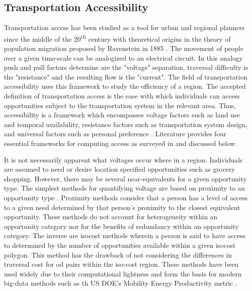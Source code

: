 \documentclass[11pt]{article}
\begin{document}
\begin{multicols}{2}
\section*{Transportation Accessibility}

Transportation access has been studied as a tool for urban and regional planners since the middle of the 20\textsuperscript{th} century with theoretical origins in the theory of population migration proposed by Ravenstein in 1885 \cite{Ravenstein_1885}. The movement of people over a given time-scale can be analogized to an electrical circuit. In this analogy push and pull factors determine are the "voltage" separation, traversal difficulty is the "resistance" and the resulting flow is the "current". The field of transportation accessibility uses this framework to study the efficiency of a region. The accepted definition of transportation access is the ease with which individuals can access opportunities subject to the transportation system in the relevant area. Thus, accessibility is a framework which encompasses voltage factors such as land use and temporal availability, resistance factors such as transportation system design, and universal factors such as personal preference \cite{Geurs_2004}. Literature provides four essential frameworks for computing access as surveyed in \cite{Handy_1997, Kwan_1998, Geurs_2004, Miller_2018, Handy_2020} and discussed below.

It is not necessarily apparent what voltages occur where in a region. Individuals are assumed to need or desire location specified opportunities such as grocery shopping. However, there may be several near-equivalents for a given opportunity type. The simplest methods for quantifying voltage are based on proximity to an opportunity type \cite{Wachs_1973, Vickerman_1974}. Proximity methods consider that a person has a level of access to a given need determined by that person's proximity to the closest equivalent opportunity. These methods do not account for heterogeneity within an opportunity category nor for the benefits of redundancy within an opportunity category. The inverse are isocost methods wherein a person is said to have access to determined by the number of opportunities available within a given isocost polygon. This method has the drawback of not considering the differences in traversal cost for \gls{od} pairs within the iso-cost region. These methods have been used widely \cite{Easa_1993} due to their computational lightness and form the basis for modern big-data methods such as th US DOE's Mobility Energy Productivity metric \cite{Hou_2019}.


\end{multicols}
\end{document}
